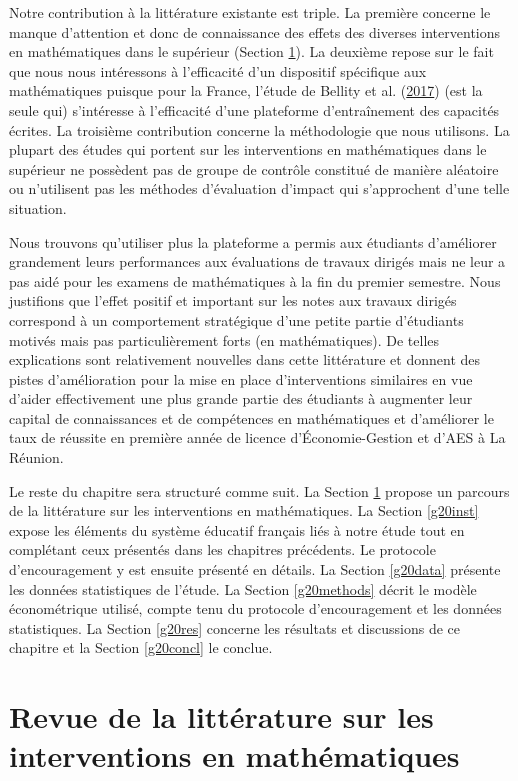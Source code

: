 \documentclass[
]{book}
\begin{document}
Notre contribution à la littérature existante est triple. La première concerne le manque d'attention et donc de connaissance des effets des diverses interventions en mathématiques dans le supérieur (Section \ref{g20litt}). La deuxième repose sur le fait que nous nous intéressons à l'efficacité d'un dispositif spécifique aux mathématiques puisque pour la France, l'étude de Bellity et al. (\protect\hyperlink{ref-BEL:eal:17}{2017}) (est la seule qui) s'intéresse à l'efficacité d'une plateforme d'entraînement des capacités écrites. La troisième contribution concerne la méthodologie que nous utilisons. La plupart des études qui portent sur les interventions en mathématiques dans le supérieur ne possèdent pas de groupe de contrôle constitué de manière aléatoire ou n'utilisent pas les méthodes d'évaluation d'impact qui s'approchent d'une telle situation.

\quad Nous trouvons qu'utiliser plus la plateforme a permis aux étudiants d'améliorer grandement leurs performances aux évaluations de travaux dirigés mais ne leur a pas aidé pour les examens de mathématiques à la fin du premier semestre. Nous justifions que l'effet positif et important sur les notes aux travaux dirigés correspond à un comportement stratégique d'une petite partie d'étudiants motivés mais pas particulièrement forts (en mathématiques). De telles explications sont relativement nouvelles dans cette littérature et donnent des pistes d'amélioration pour la mise en place d'interventions similaires en vue d'aider effectivement une plus grande partie des étudiants à augmenter leur capital de connaissances et de compétences en mathématiques et d'améliorer le taux de réussite en première année de licence d'Économie-Gestion et d'AES à La Réunion.

\quad Le reste du chapitre sera structuré comme suit. La Section \ref{g20litt} propose un parcours de la littérature sur les interventions en mathématiques. La Section \ref{g20inst} expose les éléments du système éducatif français liés à notre étude tout en complétant ceux présentés dans les chapitres précédents. Le protocole d'encouragement y est ensuite présenté en détails. La Section \ref{g20data} présente les données statistiques de l'étude. La Section \ref{g20methods} décrit le modèle économétrique utilisé, compte tenu du protocole d'encouragement et les données statistiques. La Section \ref{g20res} concerne les résultats et discussions de ce chapitre et la Section \ref{g20concl} le conclue.

\hypertarget{g20litt}{%
\section{Revue de la littérature sur les interventions en mathématiques}\label{g20litt}}
\end{document}
